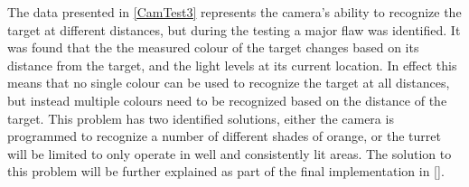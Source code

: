 
The data presented in \autoref{CamTest3} represents the camera's ability
to recognize the target at different distances, but during the testing a major
flaw was identified. It was found that the the measured colour of the target
changes based on its distance from the target, and the light levels at its
current location. In effect this means that no single colour can be used to
recognize the target at all distances, but instead multiple colours need to be
recognized based on the distance of the target. This problem has two identified
solutions, either the camera is programmed to recognize a number of different
shades of orange, or the turret will be limited to only operate in well and
consistently lit areas. The solution to this problem will be further explained
as part of the final implementation in \autoref{}.

